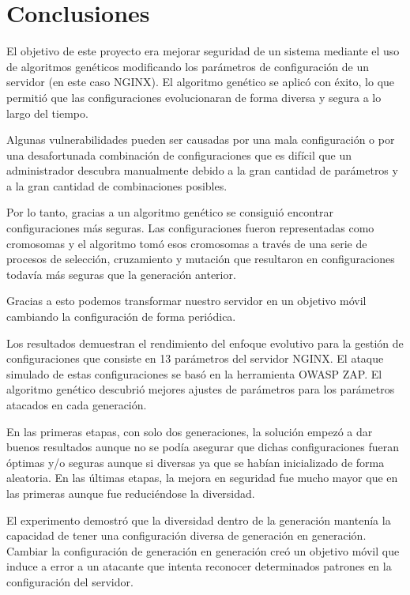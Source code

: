 \chapter{Conclusiones}

El objetivo de este proyecto era mejorar seguridad de un sistema mediante el uso de algoritmos genéticos modificando los parámetros de configuración de un servidor (en este caso NGINX). El algoritmo genético se aplicó con éxito, lo que permitió que las configuraciones evolucionaran de forma diversa y segura a lo largo del tiempo.

\bigskip
Algunas vulnerabilidades pueden ser causadas por una mala configuración o por una desafortunada combinación de configuraciones que es difícil que un administrador descubra manualmente debido a la gran cantidad de parámetros y a la gran cantidad de combinaciones posibles.

\bigskip
Por lo tanto, gracias a un algoritmo genético se consiguió encontrar configuraciones más seguras. Las configuraciones fueron representadas como cromosomas y el algoritmo tomó esos cromosomas a través de una serie de procesos de selección, cruzamiento y mutación que resultaron en configuraciones todavía más seguras que la generación anterior.

\bigskip
Gracias a esto podemos transformar nuestro servidor en un objetivo móvil cambiando la configuración de forma periódica.

\bigskip
Los resultados demuestran el rendimiento del enfoque evolutivo para la gestión de configuraciones que consiste en 13 parámetros del servidor NGINX. El ataque simulado de estas configuraciones se basó en la herramienta OWASP ZAP. El algoritmo genético descubrió mejores ajustes de parámetros para los parámetros atacados en cada generación.

\bigskip
En las primeras etapas, con solo dos generaciones, la solución empezó a dar buenos resultados aunque no se podía asegurar que dichas configuraciones fueran óptimas y/o seguras aunque si diversas ya que se habían inicializado de forma aleatoria. En las últimas etapas, la mejora en seguridad fue mucho mayor que en las primeras aunque fue reduciéndose la diversidad.

\bigskip
El experimento demostró que la diversidad dentro de la generación mantenía la capacidad de tener una configuración diversa de generación en generación. Cambiar la configuración de generación en generación creó un objetivo móvil que induce a error a un atacante que intenta reconocer determinados patrones en la configuración del servidor.

